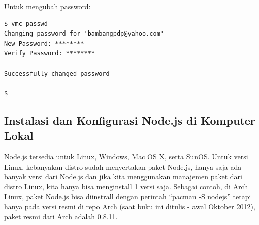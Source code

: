 Untuk mengubah password:

\lstset{language=bash,caption=Mengubah password server}
\begin{lstlisting}
$ vmc passwd 
Changing password for 'bambangpdp@yahoo.com' 
New Password: ******** 
Verify Password: ******** 

Successfully changed password 

$
\end{lstlisting}

\subsection{Instalasi dan Konfigurasi Node.js di Komputer Lokal}

Node.js tersedia untuk Linux, Windows, Mac OS X, serta SunOS. Untuk versi Linux, kebanyakan distro sudah menyertakan paket Node.js, hanya saja ada banyak versi dari Node.js dan jika kita menggunakan manajemen paket dari distro Linux, kita hanya bisa menginstall 1 versi saja. Sebagai contoh, di Arch Linux, paket Node.js bisa diinstrall dengan perintah ``pacman -S nodejs'' tetapi hanya pada versi resmi di repo Arch (saat buku ini ditulis - awal Oktober 2012), paket resmi dari Arch adalah 0.8.11. 

